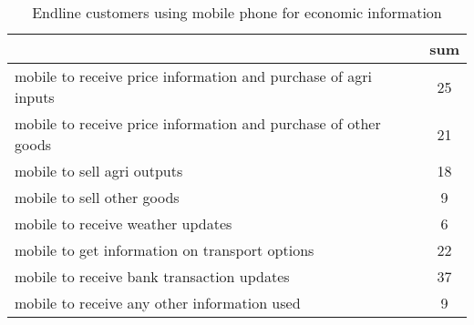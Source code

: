 \begin{table}[htbp]\centering
\def\sym#1{\ifmmode^{#1}\else\(^{#1}\)\fi}
\caption{Endline customers using mobile phone for economic information \label{tab:"label"}}
\begin{tabular*}{0.9\hsize}{@{\hskip\tabcolsep\extracolsep\fill}l*{1}{c}}
\toprule
                                &      sum\\
\midrule
mobile to receive price information and purchase of agri inputs&       25\\
mobile to receive price information and purchase of other goods&       21\\
mobile to sell agri outputs     &       18\\
mobile to sell other goods      &        9\\
mobile to receive weather updates&        6\\
mobile to get information on transport options&       22\\
mobile to receive bank transaction updates&       37\\
mobile to receive any other information used&        9\\
\bottomrule
\end{tabular*}
\end{table}
